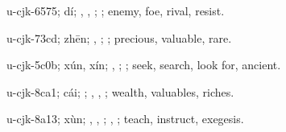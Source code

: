 \begin{multicols}{2}
{\cjkgGlue{}u-cjk-6575; dí; \cjkgGlue{}, \cjkgGlue{}, \cjkgGlue{}\cjkgGlue{}\cjkgGlue{}; \cjkgGlue{}; enemy, foe, rival, resist.

\cjkgGlue{}u-cjk-73cd; zhēn; \cjkgGlue{}\cjkgGlue{}\cjkgGlue{}, \cjkgGlue{}; \cjkgGlue{}; precious, valuable, rare.

\cjkgGlue{}u-cjk-5c0b; xún, xín; \cjkgGlue{}\cjkgGlue{}\cjkgGlue{}, \cjkgGlue{}; \cjkgGlue{}; seek, search, look for, ancient.

\cjkgGlue{}u-cjk-8ca1; cái; \cjkgGlue{}; \cjkgGlue{}, \cjkgGlue{}, \cjkgGlue{}; wealth, valuables, riches.

\cjkgGlue{}u-cjk-8a13; xùn; \cjkgGlue{}\cjkgGlue{}\cjkgGlue{}, \cjkgGlue{}\cjkgGlue{}\cjkgGlue{}, \cjkgGlue{}\cjkgGlue{}\cjkgGlue{}; \cjkgGlue{}, \cjkgGlue{}; teach, instruct, exegesis.

}
\end{multicols}
